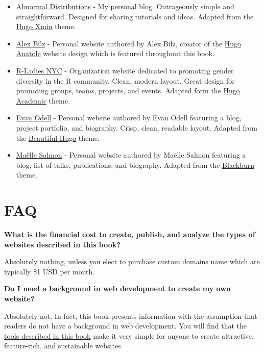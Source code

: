 \documentclass[
]{book}
\begin{document}
\begin{itemize}
\item
  \href{https://abndistro.com}{Abnormal Distributions} - My personal blog. Outrageously simple and straightforward. Designed for sharing tutorials and ideas. Adapted from the \href{https://themes.gohugo.io/hugo-xmin/}{Hugo Xmin} theme.
\item
  \href{https://www.alexbilz.com/}{Alex Bilz} - Personal website authored by Alex Bilz, creator of the \href{https://themes.gohugo.io/theme/anatole/}{Hugo Anatole} website design which is featured throughout this book.
\item
  \href{http://www.rladiesnyc.org/}{R-Ladies NYC} - Organization website dedicated to promoting gender diversity in the R community. Clean, modern layout. Great design for promoting groups, teams, projects, and events. Adapted form the \href{https://themes.gohugo.io/academic/}{Hugo Academic} theme.
\item
  \href{https://evanodell.com/blog/}{Evan Odell} - Personal website authored by Evan Odell featuring a blog, project portfolio, and biography. Crisp, clean, readable layout. Adapted from the \href{https://themes.gohugo.io/beautifulhugo/}{Beautiful Hugo} theme.
\item
  \href{https://masalmon.eu/}{Maëlle Salmon} - Personal website authored by Maëlle Salmon featuring a blog, list of talks, publications, and biography. Adapted from the \href{https://themes.gohugo.io/blackburn/}{Blackburn} theme.
\end{itemize}

\hypertarget{faq}{%
\section{FAQ}\label{faq}}

\textbf{What is the financial cost to create, publish, and analyze the types of websites described in this book?}

Absolutely nothing, unless you elect to purchase custom domains name which are typically \$1 USD per month.

\textbf{Do I need a background in web development to create my own website?}

Absolutely not. In fact, this book presents information with the assumption that readers do not have a background in web development. You will find that the \protect\hyperlink{tools}{tools described in this book} make it very simple for anyone to create attractive, feature-rich, and sustainable websites.
\end{document}
